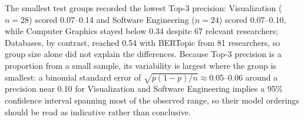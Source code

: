 The smallest test groups recorded the lowest Top-3 precision: Visualization ($n=28$) scored 0.07--0.14 and Software Engineering ($n=24$) scored 0.07--0.10, while Computer Graphics stayed below 0.34 despite 67 relevant researchers; Databases, by contrast, reached 0.54 with BERTopic from 81 researchers, so group size alone did not explain the differences. Because Top-3 precision is a proportion from a small sample, its variability is largest where the group is smallest: a binomial standard error of $\sqrt{p(1-p)/n} \approx 0.05\text{--}0.06$ around a precision near 0.10 for Visualization and Software Engineering implies a 95\% confidence interval spanning most of the observed range, so their model orderings should be read as indicative rather than conclusive.
